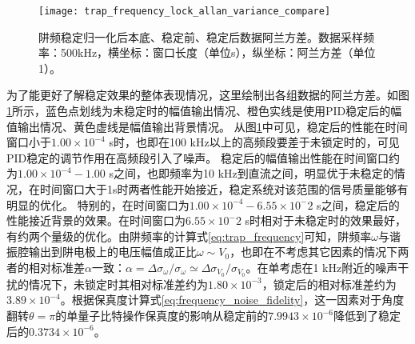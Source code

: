 \begin{figure}
    \centering
    \texttt{[image: trap\_frequency\_lock\_allan\_variance\_compare]}
    \caption[阱频稳定归一化后本底、稳定前、稳定后数据阿兰方差。]{阱频稳定归一化后本底、稳定前、稳定后数据阿兰方差。数据采样频率：500kHz，横坐标：窗口长度（单位s），纵坐标：阿兰方差（单位1）。\label{fig:trap_frequency_lock_allan_variance_compare}}
\end{figure}


为了能更好了解稳定效果的整体表现情况，这里绘制出各组数据的阿兰方差。如图\ref{fig:trap_frequency_lock_allan_variance_compare}所示，蓝色点划线为未稳定时的幅值输出情况、橙色实线是使用PID稳定后的幅值输出情况、黄色虚线是幅值输出背景情况。
从图\ref{fig:trap_frequency_lock_allan_variance_compare}中可见，稳定后的性能在时间窗口小于$1.00\times 10^{-4}$ s时，也即在100 kHz以上的高频段要差于未锁定时的，可见PID稳定的调节作用在高频段引入了噪声。
稳定后的幅值输出性能在时间窗口约为$1.00\times 10^{-4}-1.00$ s之间，也即频率为10 kHz到直流之间，明显优于未稳定的情况，在时间窗口大于1s时两者性能开始接近，稳定系统对该范围的信号质量能够有明显的优化。
特别的，在时间窗口为$1.00\times 10^{-4}-6.55\times 10^-2$ s之间，稳定后的性能接近背景的效果。在时间窗口为$6.55\times 10^-2$ s时相对于未稳定时的效果最好，有约两个量级的优化。由阱频率的计算式\eqref{eq:trap_frequency}可知，阱频率$\omega$与谐振腔输出到阱电极上的电压幅值成正比$\omega\sim V_0$，也即在不考虑其它因素的情况下两者的相对标准差$\alpha$一致：$\alpha=\Delta\sigma_{\omega}/\sigma_{\omega}\simeq\Delta\sigma_{V_0}/\sigma_{V_0}$。在单考虑在1 kHz附近的噪声干扰的情况下，未锁定时其相对标准差约为$1.80\times10^{-3}$，锁定后的相对标准差约为$3.89\times10^{-4}$。根据保真度计算式\eqref{eq:frequency_noise_fidelity}，这一因素对于角度翻转$\theta=\pi$的单量子比特操作保真度的影响从稳定前的$7.9943\times10^{-6}$降低到了稳定后的$0.3734\times10^{-6}$。








